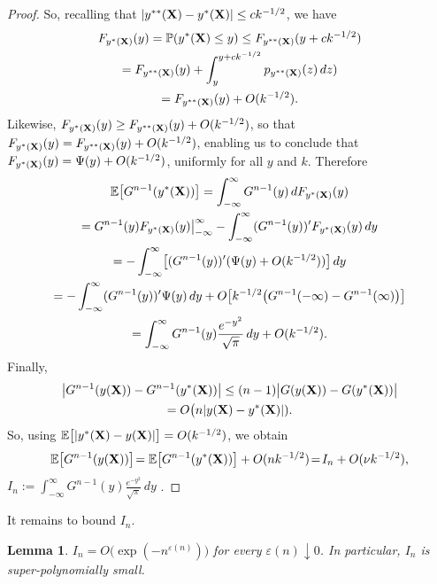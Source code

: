 \documentclass[11pt]{amsart}
\newtheorem{lemma}[theorem]{Lemma}
\def\eps{\varepsilon}
\theoremstyle{remark}
\numberwithin{equation}{section}
\begin{document}
\begin{proof}
So, recalling that $|y^{**}(\bold X)-y^*(\bold X)|\le c k^{-1/2}$, we have 
\begin{multline*}
F_{y^*(\bold X)}(y)=\Bbb P(y^*(\bold X)\le y)\le F_{y^{**}(\bold X)}(y+c k^{-1/2})\\
=F_{y^{**}(\bold X)}(y)+\int_y^{y+c k^{-1/2}}p_{y^{**}(\bold X)}(z)\,dz)\\
=F_{y^{**}(\bold X)}(y)+O(k^{-1/2}).
\end{multline*}
Likewise, $F_{y^*(\bold X)}(y)\ge F_{y^{**}(\bold X)}(y)+O(k^{-1/2})$, so that $F_{y^*(\bold X)}(y)= F_{y^{**}(\bold X)}(y)+O(k^{-1/2})$, enabling us to conclude that 
$F_{y^*(\bold X)}(y)=\Psi(y)+O(k^{-1/2})$, 
uniformly for all $y$ and $k$.
Therefore 
\begin{multline*}
\Bbb E\bigl[G^{n-1}(y^{*}(\bold X))\bigr]=\int_{-\infty}^{\infty}G^{n-1}(y)\,dF_{y^{*}(\bold X)}(y)\\
=G^{n-1}(y)F_{y^{*}(\bold X)}(y)\big|_{-\infty}^{\infty}-\int_{-\infty}^{\infty}(G^{n-1}(y))'F_{y^{*}(\bold X)}(y)\,dy\\
=-\int_{-\infty}^{\infty}\bigl[(G^{n-1}(y))' (\Psi(y)+O(k^{-1/2}))\bigr]\,dy\\
=-\int_{-\infty}^{\infty}(G^{n-1}(y))' \Psi(y)\,dy +O\bigl[k^{-1/2}\bigl(G^{n-1}(-\infty)-G^{n-1}(\infty)\bigr)\bigr]\\
=\int_{-\infty}^{\infty}G^{n-1}(y)\frac{e^{-y^2}}{\sqrt{\pi}}\,dy+O(k^{-1/2}).
\end{multline*} 
Finally, 
\begin{multline*}
\big |G^{n-1}(y(\bold X))-G^{n-1}(y^*(\bold X))\big|\le (n-1)\big|G(y(\bold X))-G(y^*(\bold X))\big|\\
=O\bigl(n|y(\bold X)-y^*(\bold X)|).
\end{multline*}
So, using $\Bbb E\bigl[|y^*(\bold X)-y(\bold X)|\bigr]=O(k^{-1/2})$, we obtain 
\begin{equation*}
\Bbb E\bigl[G^{n-1}(y(\bold X))\bigr]\!=\Bbb E\bigl[G^{n-1}(y^*(\bold X))\bigr]+O(nk^{-1/2})\!=\!I_{n}+O(\nu k^{-1/2}),
\end{equation*} 
$I_{n}:=\!\int_{-\infty}^{\infty}G^{n-1}(y)\frac{e^{-y^2}}{\sqrt{\pi}}\,dy$ . 
\end{proof}
It remains to bound $I_n$.
\begin{lemma}\label{nlem3} $I_n=O\bigl(\exp(-n^{\eps(n)})\bigr)$ for every $\eps(n)\downarrow 0$. In particular, $I_n$ is super-polynomially small.
\end{lemma}
\end{document}
